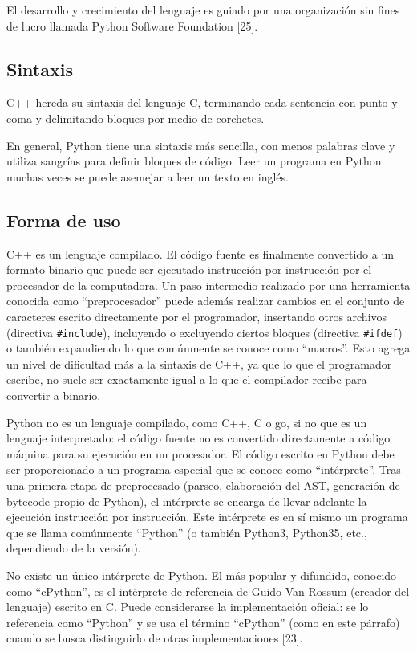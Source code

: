 El desarrollo y crecimiento del lenguaje es guiado por una organización sin
fines de lucro llamada Python Software Foundation [25].

\subsection{Sintaxis}

C++ hereda su sintaxis del lenguaje C, terminando cada sentencia con punto y
coma y delimitando bloques por medio de corchetes. 

En general, Python tiene una sintaxis más sencilla, con menos palabras clave y
utiliza sangrías para definir bloques de código. Leer un programa en Python
muchas veces se puede asemejar a leer un texto en inglés.

\subsection{Forma de uso}

C++ es un lenguaje compilado. El código fuente es finalmente convertido a un
formato binario que puede ser ejecutado instrucción por instrucción por el
procesador de la computadora. Un paso intermedio realizado por una herramienta
conocida como ``preprocesador'' puede además realizar cambios en el conjunto de
caracteres escrito directamente por el programador, insertando otros archivos
(directiva \verb!#include!), incluyendo o excluyendo ciertos bloques (directiva
\verb!#ifdef!) o también expandiendo lo que comúnmente se conoce como ``macros''.
Esto agrega un nivel de dificultad más a la sintaxis de C++, ya que lo que el
programador escribe, no suele ser exactamente igual a lo que el compilador
recibe para convertir a binario.

Python no es un lenguaje compilado, como C++, C o go, si no que es un lenguaje
interpretado: el código fuente no es convertido directamente a código máquina
para su ejecución en un procesador. El código escrito en Python debe ser
proporcionado a un programa especial que se conoce como ``intérprete''. Tras
una primera etapa de preprocesado (parseo, elaboración del AST, generación de
bytecode propio de Python), el intérprete se encarga de llevar adelante la
ejecución instrucción por instrucción. Este intérprete es en sí mismo un
programa que se llama comúnmente ``Python'' (o también Python3, Python35,
etc., dependiendo de la versión).

No existe un único intérprete de Python. El más popular y difundido, conocido
como ``cPython'', es el intérprete de referencia de Guido Van Rossum (creador
del lenguaje) escrito en C. Puede considerarse la implementación oficial: se lo
referencia como ``Python'' y se usa el término ``cPython'' (como en este
párrafo) cuando se busca distinguirlo de otras implementaciones [23].

